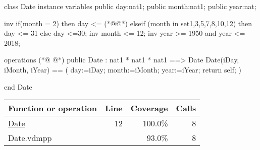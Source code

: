 \begin{vdmpp}[breaklines=true]
class Date
instance variables
  public day:nat1;
  public month:nat1;
  public year:nat;
 
 inv if(month = 2) then day <= (*@@*) elseif (month in set{1,3,5,7,8,10,12}) then day <= 31 else day <=30;
 inv month <= 12;
 inv year >= 1950 and year <= 2018;

operations
(*@
\label{Date:12}
@*)
  public  Date : nat1 * nat1 * nat1  ==> Date
  Date(iDay, iMonth, iYear) == (
   day:=iDay;
   month:=iMonth;
   year:=iYear;
   return self;
  )

end Date
\end{vdmpp}
\bigskip
\begin{longtable}{|l|r|r|r|}
\hline
Function or operation & Line & Coverage & Calls \\
\hline
\hline
\hyperref[Date:12]{Date} & 12&100.0\% & 8 \\
\hline
\hline
Date.vdmpp & & 93.0\% & 8 \\
\hline
\end{longtable}

